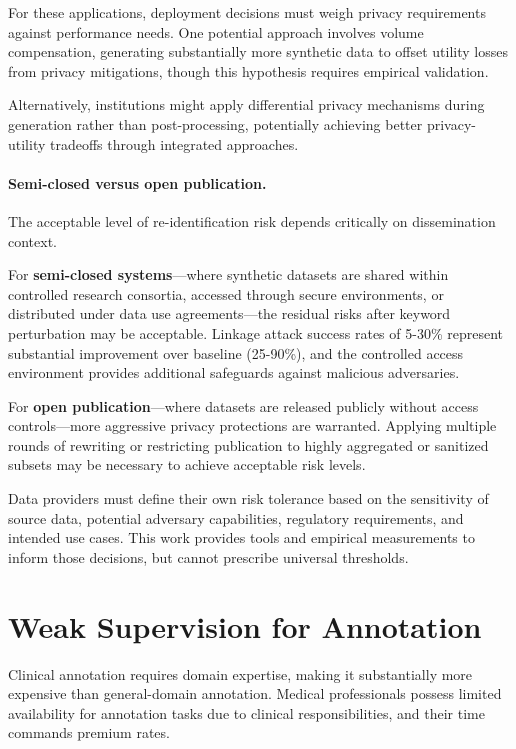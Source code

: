 For these applications, deployment decisions must weigh privacy requirements against performance needs.
One potential approach involves volume compensation, generating substantially more synthetic data to offset utility losses from privacy mitigations, though this hypothesis requires empirical validation.

Alternatively, institutions might apply differential privacy mechanisms during generation rather than post-processing, potentially achieving better privacy-utility tradeoffs through integrated approaches.

\paragraph{Semi-closed versus open publication.}

The acceptable level of re-identification risk depends critically on dissemination context.

For \textbf{semi-closed systems}—where synthetic datasets are shared within controlled research consortia, accessed through secure environments, or distributed under data use agreements—the residual risks after keyword perturbation may be acceptable.
Linkage attack success rates of 5-30\% represent substantial improvement over baseline (25-90\%), and the controlled access environment provides additional safeguards against malicious adversaries.

For \textbf{open publication}—where datasets are released publicly without access controls—more aggressive privacy protections are warranted.
Applying multiple rounds of rewriting or restricting publication to highly aggregated or sanitized subsets may be necessary to achieve acceptable risk levels.

Data providers must define their own risk tolerance based on the sensitivity of source data, potential adversary capabilities, regulatory requirements, and intended use cases.
This work provides tools and empirical measurements to inform those decisions, but cannot prescribe universal thresholds.
\section{Weak Supervision for Annotation}

Clinical annotation requires domain expertise, making it substantially more expensive than general-domain annotation.
Medical professionals possess limited availability for annotation tasks due to clinical responsibilities, and their time commands premium rates.

